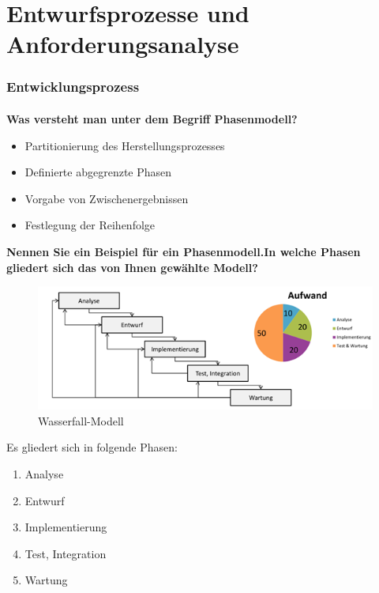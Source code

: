 \setcounter{section}{0}
\part{Entwurfsprozesse und Anforderungsanalyse}
\section{Entwicklungsprozess}
\subsection{}
\textbf{Was versteht man unter dem Begriff Phasenmodell?}
\begin{itemize}
    \item Partitionierung des Herstellungsprozesses
    \item Definierte abgegrenzte Phasen
    \item Vorgabe von Zwischenergebnissen
    \item Festlegung der Reihenfolge
\end{itemize}

\textbf{Nennen Sie ein Beispiel für ein Phasenmodell.In welche Phasen gliedert sich das von Ihnen gewählte
    Modell?}
\begin{figure}[H]
    \centering
    \includegraphics[width=.6\linewidth]{Graphics/Wasserfall-Modell.png}
    \caption{Wasserfall-Modell}
\end{figure}
Es gliedert sich in folgende Phasen:
\begin{enumerate}
    \item Analyse
    \item Entwurf
    \item Implementierung
    \item Test, Integration
    \item Wartung
\end{enumerate}

